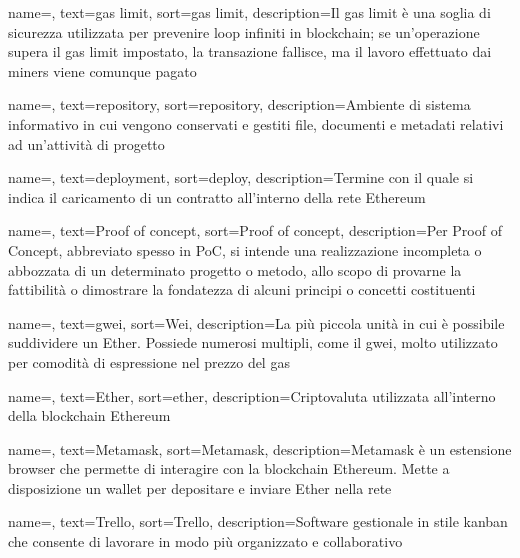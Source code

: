 {
    name=,
    text=gas limit,
    sort=gas limit,
    description={Il gas limit è una soglia di sicurezza utilizzata per prevenire loop infiniti in blockchain; se un'operazione supera il gas limit impostato, la transazione fallisce, ma il lavoro effettuato dai miners viene comunque pagato}
}

{
    name=,
    text=repository,
    sort=repository,
    description={Ambiente di sistema informativo in cui vengono conservati e gestiti file, documenti e metadati relativi ad un'attività di progetto}
}

{
    name=,
    text=deployment,
    sort=deploy,
    description={Termine con il quale si indica il caricamento di un contratto all'interno della rete Ethereum}
}

{
    name=,
    text=Proof of concept,
    sort=Proof of concept,
    description={Per Proof of Concept, abbreviato spesso in PoC, si intende una realizzazione incompleta o abbozzata di un determinato progetto o metodo, allo
scopo di provarne la fattibilità o dimostrare la fondatezza di alcuni principi o concetti costituenti}
}

{
    name=,
    text=gwei,
    sort=Wei,
    description={La più piccola unità in cui è possibile suddividere un Ether. Possiede numerosi multipli, come il gwei, molto utilizzato per comodità di espressione nel prezzo del gas}
}

{
    name=,
    text=Ether,
    sort=ether,
    description={Criptovaluta utilizzata all'interno della blockchain Ethereum}
}

{
    name=,
    text=Metamask,
    sort=Metamask,
    description={Metamask è un estensione browser che permette di interagire con la blockchain Ethereum. Mette a disposizione un wallet per depositare e inviare Ether nella rete}
}

{
    name=,
    text=Trello,
    sort=Trello,
    description={Software gestionale in stile kanban che consente di lavorare in modo più organizzato e collaborativo}
}

